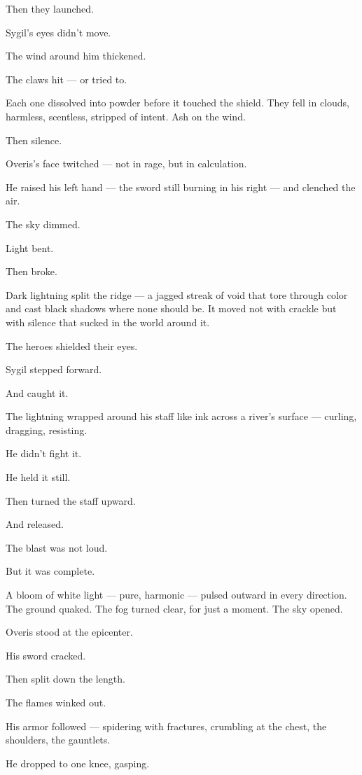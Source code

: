 \documentclass[12pt]{article}
\begin{document}
Then they launched.

Sygil’s eyes didn’t move.

The wind around him thickened.

The claws hit — or tried to.

Each one dissolved into powder before it touched the shield. They fell in clouds, harmless, scentless, stripped of intent. Ash on the wind.

Then silence.

\bigskip

Overis’s face twitched — not in rage, but in calculation.

He raised his left hand — the sword still burning in his right — and clenched the air.

The sky dimmed.

Light bent.

Then broke.

Dark lightning split the ridge — a jagged streak of void that tore through color and cast black shadows where none should be. It moved not with crackle but with silence that sucked in the world around it.

The heroes shielded their eyes.

Sygil stepped forward.

And caught it.

The lightning wrapped around his staff like ink across a river’s surface — curling, dragging, resisting.

He didn’t fight it.

He held it still.

Then turned the staff upward.

And released.

\bigskip

The blast was not loud.

But it was complete.

A bloom of white light — pure, harmonic — pulsed outward in every direction. The ground quaked. The fog turned clear, for just a moment. The sky opened.

Overis stood at the epicenter.

His sword cracked.

Then split down the length.

The flames winked out.

His armor followed — spidering with fractures, crumbling at the chest, the shoulders, the gauntlets.

He dropped to one knee, gasping.
\end{document}
